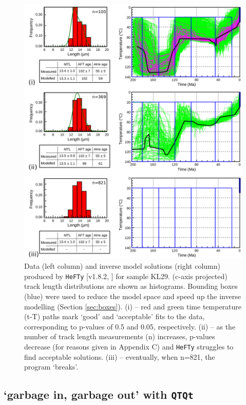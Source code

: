 \documentclass{article}
\begin{document}
\begin{figure}[!ht]
\centering
\includegraphics[width=\textwidth]{fig7.png}
\caption{Data (left column) and inverse model solutions (right column)
  produced by {\tt HeFTy} [v1.8.2, \cite{ketcham2005}] for sample
  KL29. (c-axis projected) track length distributions are shown as
  histograms. Bounding boxes (blue) were used to reduce the model
  space and speed up the inverse modelling (Section
  \ref{sec:boxes}). (i) -- red and green time temperature (t-T) paths
  mark `good' and `acceptable' fits to the data, corresponding to
  p-values of 0.5 and 0.05, respectively. (ii) -- as the number of
  track length measurements (n) increases, p-values decrease (for
  reasons given in Appendix C) and {\tt HeFTy} struggles to find
  acceptable solutions. (iii) -- eventually, when n=821, the program
  `breaks'.}
\label{fig:Anti-HeFTy}
\end{figure}

\subsection{`garbage in, garbage out' with {\tt QTQt}}
\label{sec:garbage}
\end{document}
